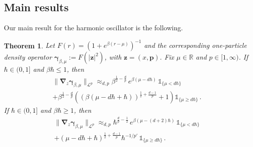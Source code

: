 \documentclass[11pt]{amsart}
\theoremstyle{plain}
\newtheorem{theorem}{Theorem}[section]
\theoremstyle{definition}
\newcommand		{\RR}		{\mathbb R}			%
\newcommand		{\R}		{\RR}
\newcommand		{\cL}		{\mathcal L}		%
\newcommand		{\lt}			{\left}				%
\newcommand		{\rt}			{\right}			%
\renewcommand	{\(}			{\lt(}
\renewcommand	{\)}			{\rt)}
\newcommand		{\n}[1]			{\lt\lvert #1 \rt\rvert}
\newcommand		{\bnrm}[1]		{\big\lVert #1\big\rVert}	%
\newcommand		{\bNrm}[2]		{\bnrm{#1}_{#2}}
\newcommand		{\indic}	{\mathds{1}}		%
\newcommand		{\opgam}	{{\boldsymbol{\gamma}}}	%
\newcommand		{\opp}		{\boldsymbol{p}}
\newcommand		{\opz}		{\mathbf{z}}%
\newcommand		{\Dh}		{\boldsymbol{\nabla}}	%
\newcommand		{\Dhz}[1]	{\Dh_{\!z} #1}
\begin{document}
\subsection{Main results}

    Our main result for the harmonic oscillator is the following. 
	\begin{theorem}\label{thm:main}
		Let $F(r) = (1+e^{\beta(r-\mu)})^{-1}$ and the corresponding one-particle density operator $\opgam_{\beta, \mu} := F(\n{\opz}^2)$, with $\opz = (x,\opp)$. Fix $\mu\in \R$ and $p\in [1, \infty)$.
		If $\hbar \in (0, 1]$ and $\beta\hbar \le 1$, then
		\begin{multline}
			\bNrm{ \Dhz \opgam_{\beta, \mu} }{\cL^p}
			\approx_{d, p} \beta^{\frac{1}{2}-\frac{d}{p}} \, e^{\beta (\mu-d\hbar)}\, \indic_{\{\mu < d\hbar\}} \\
			+\beta^{\frac{1}{2}-\frac{d}{p}}\lt((\beta\lt(\mu-d\hbar+\hbar\rt))^{\frac{1}{2}+\frac{d-1}{p}}  +1\rt) \indic_{\{\mu \ge d\hbar\}}\,.
		\end{multline}
		If $\hbar \in (0, 1]$ and $\beta\hbar\ge 1$, then
		\begin{multline}
			\bNrm{ \Dhz \opgam_{\beta, \mu} }{\cL^p}
			\approx_{d, p} \hbar^{\frac{d}{p}-\frac{1}{2}} \, e^{\beta(\mu-(d+2)\hbar)} \, \indic_{\{\mu < d\hbar\}}
			\\
			+ \lt(\mu-d\hbar+\hbar\rt)^{\frac{1}{2}+\frac{d-1}{p}} \hbar^{-1/p'} \,\indic_{\{\mu \ge d\hbar\}} \, .
		\end{multline}
	\end{theorem}
\end{document}
